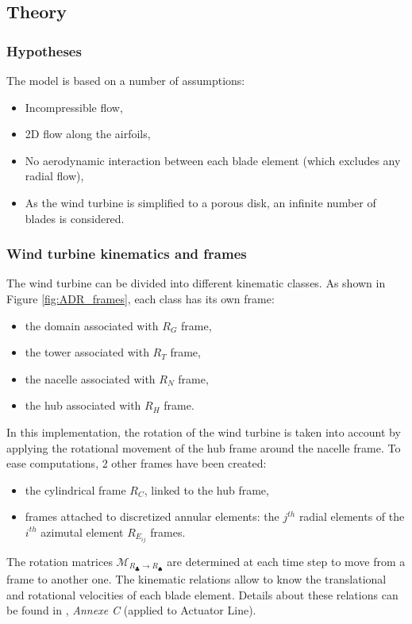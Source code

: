 \subsection{Theory}
\subsubsection*{Hypotheses}
\label{ss:hypADR}
The model is based on a number of assumptions:
\begin{itemize}
\item Incompressible flow,
\item 2D flow along the airfoils,
\item No aerodynamic interaction between each blade element (which excludes any radial flow),
\item As the wind turbine is simplified to a porous disk, an infinite number of blades is considered.
\end{itemize}

\subsubsection*{Wind turbine kinematics and frames}		
\label{ss:EOL_M_cinematiqueADR}
The wind turbine can be divided into different kinematic classes. As shown in Figure \ref{fig:ADR_frames}, each class has its own frame:
\begin{multicols}{2}
\begin{itemize}
\item the domain associated with $R_G$ frame,
\item the tower associated with $R_T$ frame,
\item the nacelle associated with $R_N$ frame,
\item the hub associated with $R_H$ frame.
\end{itemize}
\end{multicols}
In this implementation, the rotation of the wind turbine is taken into account by applying the rotational movement of the hub frame around the nacelle frame. To ease computations, 2 other frames have been created:
\begin{itemize}
\item the cylindrical frame $R_{C}$, linked to the hub frame,
\item frames attached to discretized annular elements: the $j^{th}$ radial elements of the $i^{th}$ azimutal element $R_{E_{ij}}$ frames.
\end{itemize}
\medbreak
The rotation matrices $\mathcal{M}_{R_\clubsuit \rightarrow R_\spadesuit}$ are determined at each time step to move from a frame to another one. The kinematic relations allow to know the translational and rotational velocities of each blade element. Details about these relations can be found in \citet{joulin2019modelisation}, \textit{Annexe C} (applied to Actuator Line).
\medbreak

